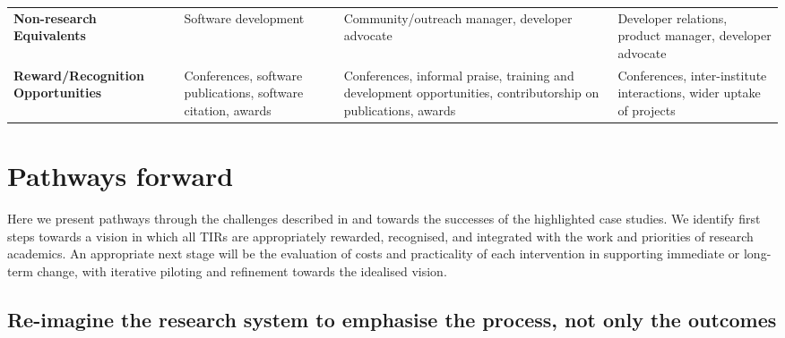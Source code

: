 \documentclass[authordate,meta]{jote-new-article}
\begin{document}
\begin{table*}[t]
\begin{fullwidth}
\begin{tabularx}{\linewidth}{@{} >{\arraybackslash\raggedright}X >{\arraybackslash\raggedright}X >{\arraybackslash\raggedright}X X @{}}
      \textbf{Non-research Equivalents}            & Software development                                                                                                 & Community/outreach manager, developer advocate
                                                   & Developer relations, product manager, developer advocate                                                                                                              \\

      \textbf{Reward/Recognition Opportunities}    & Conferences, software publications, software citation, awards
                                                   & Conferences, informal praise, training and development opportunities, contributorship on publications, awards
                                                   & Conferences, inter-institute interactions, wider uptake of projects                                                                                                   \\
    \end{tabularx}
  \end{fullwidth}
\end{table*}









\section{Pathways forward}



Here we present pathways through the challenges described in and towards the successes of the highlighted case studies. We identify first steps towards a vision in which all TIRs are appropriately rewarded, recognised, and integrated with the work and priorities of research academics. An appropriate next stage will be the evaluation of costs and practicality of each intervention in supporting immediate or long-term change, with iterative piloting and refinement towards the idealised vision.







\subsection{Re-imagine the research system to emphasise the process, not only the outcomes}
\end{document}
